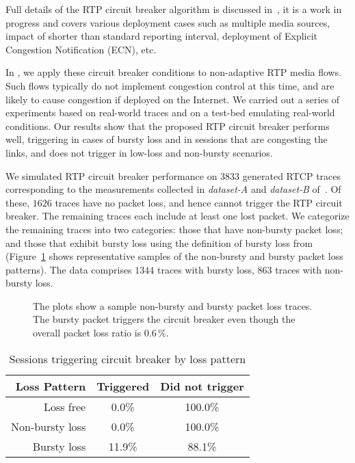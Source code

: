 Full details of the RTP circuit breaker algorithm is discussed
in~\cite{draft.rtp.cb}, it is a work in progress and covers various deployment
cases such as multiple media sources, impact of shorter than standard
reporting interval, deployment of Explicit Congestion Notification (ECN), etc.

In , we apply these circuit breaker conditions to non-adaptive
RTP media flows. Such flows typically do not implement congestion control at
this time, and are likely to cause congestion if deployed on the Internet. We
carried out a series of experiments based on real-world traces and on a
test-bed emulating real-world conditions. Our results show that the proposed
RTP circuit breaker performs well, triggering in cases of bursty loss and in
sessions that are congesting the links, and does not trigger in low-loss and
non-bursty scenarios. 

We simulated RTP circuit breaker performance on $3833$ generated RTCP traces
corresponding to the measurements collected in \emph{dataset-A} and
\emph{dataset-B} of~\cite{ellis:2011:dataset}. Of these, $1626$ traces have no
packet loss, and hence cannot trigger the RTP circuit breaker. The remaining
traces each include at least one lost packet. We categorize the remaining
traces into two categories: those that have non-bursty packet loss; and those
that exhibit bursty loss using the definition of bursty loss
from~\cite{rfc3611} (Figure~\ref{fig:bursty} shows representative samples of
the non-bursty and bursty packet loss patterns). The data comprises $1344$
traces with bursty loss, $863$ traces with non-bursty loss.

\begin{figure}
  \centerline{
  }
  \caption{The plots show a sample non-bursty and bursty packet loss traces.
  The bursty packet triggers the circuit breaker even though the overall
  packet loss ratio is 0.6\,\%.}
  \label{fig:bursty}
\end{figure}

\begin{table}
  \begin{center}
    \begin{tabular}{rcc}
    \toprule
    Loss Pattern       & Triggered & Did not trigger \\
    \midrule
             Loss free &   0.0\% & 100.0\% \\
       Non-bursty loss &   0.0\% & 100.0\% \\
          Bursty loss  &  11.9\% &  88.1\% \\
    \bottomrule
    \end{tabular}
    \caption{Sessions triggering circuit breaker by loss pattern}
    \label{tab:cb_bursty}
  \end{center}
\end{table}



